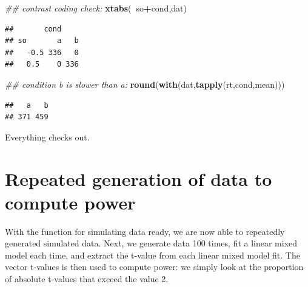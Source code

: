 \documentclass[12pt,]{krantz}
\newenvironment{Shaded}{\begin{snugshade}}{\end{snugshade}}
\newcommand{\CommentTok}[1]{\textcolor[rgb]{0.56,0.35,0.01}{\textit{#1}}}
\newcommand{\KeywordTok}[1]{\textcolor[rgb]{0.13,0.29,0.53}{\textbf{#1}}}
\newcommand{\NormalTok}[1]{#1}
\newcommand{\OperatorTok}[1]{\textcolor[rgb]{0.81,0.36,0.00}{\textbf{#1}}}
\begin{document}
\begin{Shaded}
\begin{Highlighting}[]
\CommentTok{##  contrast coding check:}
\KeywordTok{xtabs}\NormalTok{(}\OperatorTok{~}\NormalTok{so}\OperatorTok{+}\NormalTok{cond,dat)}
\end{Highlighting}
\end{Shaded}

\begin{verbatim}
##       cond
## so       a   b
##   -0.5 336   0
##   0.5    0 336
\end{verbatim}

\begin{Shaded}
\begin{Highlighting}[]
\CommentTok{## condition b is slower than a:}
\KeywordTok{round}\NormalTok{(}\KeywordTok{with}\NormalTok{(dat,}\KeywordTok{tapply}\NormalTok{(rt,cond,mean)))}
\end{Highlighting}
\end{Shaded}

\begin{verbatim}
##   a   b 
## 371 459
\end{verbatim}

Everything checks out.

\hypertarget{repeated-generation-of-data-to-compute-power}{%
\section{Repeated generation of data to compute power}\label{repeated-generation-of-data-to-compute-power}}

With the function for simulating data ready, we are now able to repeatedly generated simulated data. Next, we generate data 100 times, fit a linear mixed model each time, and extract the t-value from each linear mixed model fit. The vector t-values is then used to compute power: we simply look at the proportion of absolute t-values that exceed the value 2.
\end{document}
